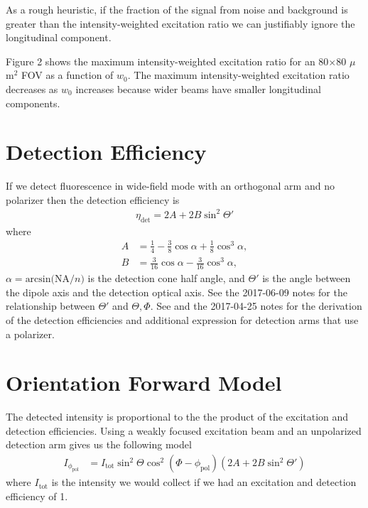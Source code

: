 \documentclass[11pt]{article}
\begin{document}
As a rough heuristic, if the fraction of the signal from noise and background is
greater than the intensity-weighted excitation ratio we can justifiably ignore
the longitudinal component.

Figure 2 shows the maximum intensity-weighted excitation ratio for an
80$\times$80 $\mu$m${}^2$ FOV as a function of $w_0$. The maximum
intensity-weighted excitation ratio decreases as $w_0$ increases because wider
beams have smaller longitudinal components.


\section{Detection Efficiency}
If we detect fluorescence in wide-field mode with an orthogonal arm and no
polarizer then the detection efficiency is
\begin{align}
  \eta_{\text{det}} = 2A + 2B\sin^2\Theta'
\end{align}
where
\begin{align}
  A &= \frac{1}{4} - \frac{3}{8}\cos\alpha + \frac{1}{8}\cos^3\alpha,\\
  B &= \frac{3}{16}\cos\alpha - \frac{3}{16}\cos^3\alpha, 
\end{align}
$\alpha = \text{arcsin(NA}/n)$ is the detection cone half angle, and $\Theta'$
is the angle between the dipole axis and the detection optical axis. See the
2017-06-09 notes for the relationship between $\Theta'$ and $\Theta,\Phi$. See
\cite{fourkas} and the 2017-04-25 notes for the derivation of the detection
efficiencies and additional expression for detection arms that use a polarizer.

\section{Orientation Forward Model}
The detected intensity is proportional to the the product of the excitation and
detection efficiencies. Using a weakly focused excitation beam and an
unpolarized detection arm gives us the following model
\begin{align}
  I_{\phi_{\text{pol}}} &= I_{\text{tot}}\sin^2\Theta\cos^2(\Phi - \phi_{\text{pol}})(2A+2B\sin^2\Theta')\label{eq:forward}
\end{align}
where $I_{\text{tot}}$ is the intensity we would collect if we had an excitation and detection efficiency of 1.
\end{document}
